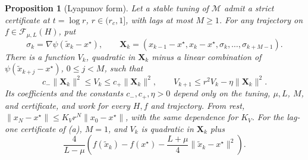 \documentclass[11pt]{article}
\newtheorem{proposition}[theorem]{Proposition}
\theoremstyle{definition}
\theoremstyle{remark}
\newcommand{\cF}{\mathcal F}
\newcommand{\cM}{\mathcal M}
\newcommand{\norm}[1]{\lVert #1\rVert}
\begin{document}
\begin{samepage}
\begin{proposition}[Lyapunov form]\label{prop:lyap}
Let a stable tuning of \(\cM\) admit a strict certificate at \(t=\log r\),
\(r\in(r_c,1]\), with lags at most \(M\ge1\).  For any trajectory on
\(f\in\cF_{\mu,L}(H)\), put
\[
\sigma_k=\nabla\psi(\tilde x_k-x^\star),\qquad
\mathbf X_k=(x_{k-1}-x^\star,x_k-x^\star,\sigma_k,\ldots,\sigma_{k+M-1}).
\]
There is a function \(V_k\), quadratic in \(\mathbf X_k\) minus a linear
combination of \(\psi(\tilde x_{k+j}-x^\star)\), \(0\le j<M\), such that
\[
c_-\norm{\mathbf X_k}^2\le V_k\le c_+\norm{\mathbf X_k}^2,\qquad
V_{k+1}\le r^2V_k-\eta\norm{\mathbf X_k}^2.
\]
Its coefficients and the constants \(c_-,c_+,\eta>0\) depend only on the tuning,
\(\mu,L\), \(M\), and certificate, and work for every \(H,f\) and trajectory.  From rest,
\(\norm{x_N-x^\star}\le K_Vr^N\norm{x_0-x^\star}\), with the same dependence
for \(K_V\).  For the lag-one certificate of (a), \(M=1\),
and \(V_k\) is quadratic in \(\mathbf X_k\) plus
\[
\frac4{L-\mu}\left(f(\tilde x_k)-f(x^\star)
-\frac{L+\mu}4\norm{\tilde x_k-x^\star}^2\right).
\]
\end{proposition}
\end{samepage}
\end{document}
